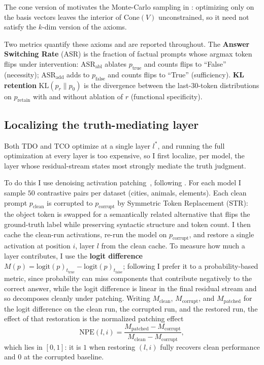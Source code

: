 \documentclass[sn-basic]{sn-jnl}
\begin{document}
The cone version of  motivates the Monte-Carlo sampling in
: optimizing only on the basis vectors leaves the interior of
$\mathrm{Cone}(V)$ unconstrained, so it need not satisfy the $k$-dim version of
the axioms.

Two metrics quantify these axioms and are reported throughout. The
\textbf{Answer Switching Rate} (ASR) is the fraction of factual prompts whose
argmax token flips under intervention: $\mathrm{ASR}_{\text{abl}}$ ablates
$p_{\text{true}}$ and counts flips to ``False'' (necessity);
$\mathrm{ASR}_{\text{add}}$ adds to $p_{\text{false}}$ and counts flips to
``True'' (sufficiency). \textbf{KL retention} $\mathrm{KL}(p_{r} \| p_{0})$ is
the divergence between the last-$30$-token distributions on $p_{\text{retain}}$
with and without ablation of $r$ (functional specificity).

\subsection{Localizing the truth-mediating layer}
\label{sec:loc}

Both TDO and TCO optimize at a single layer $l^{*}$, and running the full
optimization at every layer is too expensive, so I first localize, per model,
the layer whose residual-stream states most strongly mediate the truth judgment.

To do this I use denoising activation
patching~\citep{heimersheimHowUseInterpret2024}, following
\citet{marksGeometryTruthEmergent2024}. For each model I sample $50$ contrastive
pairs per dataset (cities, animals, elements). Each clean prompt
$p_{\text{clean}}$ is corrupted to $p_{\text{corrupt}}$ by Symmetric Token
Replacement (STR): the object token is swapped for a semantically related
alternative that flips the ground-truth label while preserving syntactic
structure and token count. I then cache the clean-run activations, re-run the
model on $p_{\text{corrupt}}$, and restore a single activation at position $i$,
layer $l$ from the clean cache. To measure how much a layer contributes, I use
the \textbf{logit difference} $M(p) = \mathrm{logit}(p)_{t_{\text{true}}} -
\mathrm{logit}(p)_{t_{\text{false}}}$; following
\citet{zhangBESTPRACTICESACTIVATION2024} I prefer it to a probability-based
metric, since probability can miss components that contribute negatively to the
correct answer, while the logit difference is linear in the final residual
stream and so decomposes cleanly under patching.
Writing $M_{\text{clean}}$, $M_{\text{corrupt}}$, and $M_{\text{patched}}$ for
the logit difference on the clean run, the corrupted run, and the restored run,
the effect of that restoration is the normalized patching effect
%
\begin{equation}
\mathrm{NPE}(l, i) =
\frac{M_{\text{patched}} - M_{\text{corrupt}}}
     {M_{\text{clean}} - M_{\text{corrupt}}},
\end{equation}
%
which lies in $[0, 1]$: it is $1$ when restoring $(l, i)$ fully recovers clean
performance and $0$ at the corrupted baseline.
\end{document}
